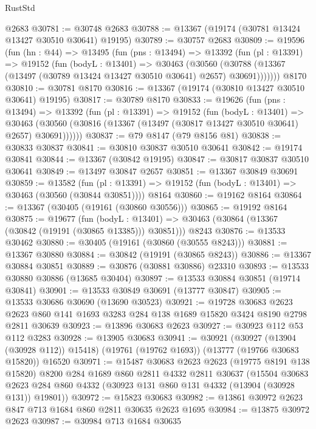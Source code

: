 \begin{lexlean}{RustStd}
\begin{coremodule}
    @2683
@30781 := @30748 @2683
@30788 := @13367 (@19174 (@30781 @13424 @13427 @30510 @30641) @19195)
@30789 := @30757 @2683
@30809 := @19596
    (fun (hn : @44) =>
    @13495
      (fun (pns : @13494) =>
      @13392
        (fun (pl : @13391) =>
        @19152
          (fun (bodyL : @13401) =>
          @30463
            (@30560
              (@30788 (@13367 (@13497 (@30789 @13424 @13427 @30510 @30641) @2657) @30691)))))))
    @8170
@30810 := @30781 @8170
@30816 := @13367 (@19174 (@30810 @13427 @30510 @30641) @19195)
@30817 := @30789 @8170
@30833 := @19626
    (fun (pns : @13494) =>
    @13392
      (fun (pl : @13391) =>
      @19152
        (fun (bodyL : @13401) =>
        @30463 (@30560 (@30816 (@13367 (@13497 (@30817 @13427 @30510 @30641) @2657) @30691))))))
@30837 := @79 @8147 (@79 @8156 @81)
@30838 := @30833 @30837
@30841 := @30810 @30837 @30510 @30641
@30842 := @19174 @30841
@30844 := @13367 (@30842 @19195)
@30847 := @30817 @30837 @30510 @30641
@30849 := @13497 @30847 @2657
@30851 := @13367 @30849 @30691
@30859 := @13582
    (fun (pl : @13391) => @19152 (fun (bodyL : @13401) => @30463 (@30560 (@30844 @30851))))
    @8164
@30860 := @19162 @8164
@30864 := @13367 (@30405 (@19161 (@30860 @30556)))
@30865 := @19192 @8164
@30875 := @19677
    (fun (bodyL : @13401) => @30463 (@30864 (@13367 (@30842 (@19191 (@30865 @13385))) @30851)))
    @8243
@30876 := @13533 @30462
@30880 := @30405 (@19161 (@30860 (@30555 @8243)))
@30881 := @13367 @30880
@30884 := @30842 (@19191 (@30865 @8243))
@30886 := @13367 @30884 @30851
@30889 := @30876 (@30881 @30886) @23310
@30893 := @13533 @30880 @30886 (@13685 @30404)
@30897 := @13533 @30884 @30851 (@19714 @30841)
@30901 := @13533 @30849 @30691 (@13777 @30847)
@30905 := @13533 @30686 @30690 (@13690 @30523)
@30921 := @19728
    @30683
    @2623
    @2623
    @860
    @141
    @1693
    @3283
    @284
    @138
    @1689
    @15820
    @3424
    @8190
    @2798
    @2811
    @30639
@30923 := @13896 @30683 @2623
@30927 := @30923 @112 @53 @112 @3283
@30928 := @13905 @30683
@30941 := @30921
    (@30927 (@13904 (@30928 @112)) @15418)
    (@19761 (@19762 @1693))
    (@13777 (@19766 @30683 @15820))
    @16520
@30971 := @15487
    @30683
    @2623
    @2623
    (@19775 @8191 @138 @15820)
    @8200
    @284
    @1689
    @860
    @2811
    @4332
    @2811
    @30637
    (@15504
      @30683
      @2623
      @284
      @860
      @4332
      (@30923 @131 @860 @131 @4332 (@13904 (@30928 @131)) @19801))
@30972 := @15823 @30683
@30982 := @13861 @30972 @2623 @847 @713 @1684 @860 @2811 @30635 @2623 @1695
@30984 := @13875 @30972 @2623
@30987 := @30984 @713 @1684 @30635

\end{coremodule}
\end{lexlean}
